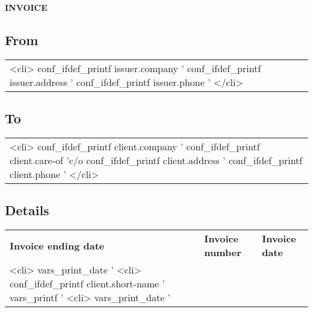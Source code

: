 \documentclass[letterpaper]{article}
\begin{document}
\thispagestyle{empty}

\begin{center}
\huge{\textbf{INVOICE}}
\end{center}

\subsection*{From}
\begin{tabular}{l}
<cli>
    conf_ifdef_printf issuer.company '%
    conf_ifdef_printf issuer.address '%
    conf_ifdef_printf issuer.phone   '%
</cli>
\end{tabular}

\subsection*{To}
\begin{tabular}{l}
<cli>
    conf_ifdef_printf client.company '%
    conf_ifdef_printf client.care-of 'c/o %
    conf_ifdef_printf client.address '%
    conf_ifdef_printf client.phone   '%
</cli>
\end{tabular}

\subsection*{Details}

\begin{center}
\begin{tabular}{l l l}
        \textbf{Invoice ending date} & \textbf{Invoice number} & \textbf{Invoice date} \\
        <cli> vars_print_date '%
        <cli> conf_ifdef_printf client.short-name '%
              vars_printf     '%
        <cli> vars_print_date '%
\end{tabular}
\end{center}
\end{document}
